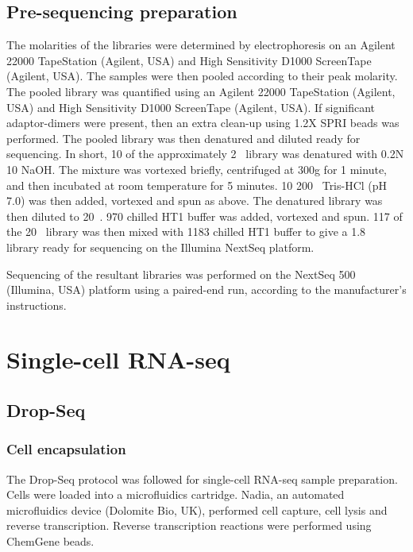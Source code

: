 \subsection{Pre-sequencing preparation}\label{subsec:preseq}
The molarities of the libraries were determined by electrophoresis on an Agilent 22000 TapeStation (Agilent, USA) and High Sensitivity D1000 ScreenTape (Agilent, USA).
The samples were then pooled according to their peak molarity.
The pooled library was quantified using an Agilent 22000 TapeStation (Agilent, USA) and High Sensitivity D1000 ScreenTape (Agilent, USA).
If significant adaptor-dimers were present, then an extra clean-up using 1.2X SPRI beads was performed.
The pooled library was then denatured and diluted ready for sequencing.
In short, 10\ul{} of the approximately 2\si{\nano\Molar} library was denatured with 0.2N 10\ul{} NaOH.
The mixture was vortexed briefly, centrifuged at 300g for 1 minute, and then incubated at room temperature for 5 minutes.
10\ul{} 200\si{\milli\Molar} Tris-HCl (pH 7.0) was then added, vortexed and spun as above.
The denatured library was then diluted to 20\si{\pico\Molar}.
970\ul{} chilled HT1 buffer was added, vortexed and spun.
117\ul{} of the 20\si{\pico\Molar} library was then mixed with 1183\ul{} chilled HT1 buffer to give a 1.8\si{\pico\Molar} library ready for sequencing on the Illumina NextSeq platform.

Sequencing of the resultant libraries was performed on the NextSeq 500 (Illumina, USA) platform using a paired-end run, according to the manufacturer's instructions.

\section{Single-cell RNA-seq}
\subsection{Drop-Seq}

\subsubsection{Cell encapsulation}
The Drop-Seq protocol\cite{macosko2015highly} was followed for single-cell RNA-seq sample preparation.
Cells were loaded into a microfluidics cartridge.
Nadia, an automated microfluidics device (Dolomite Bio, UK), performed cell capture, cell lysis and reverse transcription.
Reverse transcription reactions were performed using ChemGene beads.

